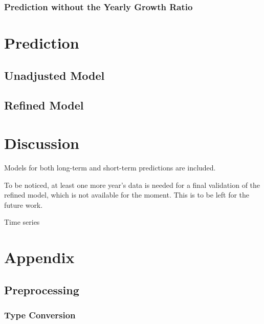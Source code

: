 \documentclass[
  twocolumn]{article}
\begin{document}
\hypertarget{prediction-without-the-yearly-growth-ratio}{%
\subsubsection{Prediction without the Yearly Growth
Ratio}\label{prediction-without-the-yearly-growth-ratio}}

\hypertarget{prediction}{%
\section{Prediction}\label{prediction}}

\hypertarget{unadjusted-model}{%
\subsection{Unadjusted Model}\label{unadjusted-model}}

\hypertarget{refined-model-1}{%
\subsection{Refined Model}\label{refined-model-1}}

\hypertarget{discussion}{%
\section{Discussion}\label{discussion}}

Models for both long-term and short-term predictions are included.

To be noticed, at least one more year's data is needed for a final
validation of the refined model, which is not available for the moment.
This is to be left for the future work.

Time series

\hypertarget{appendix}{%
\section{Appendix}\label{appendix}}

\hypertarget{preprocessing}{%
\subsection{Preprocessing}\label{preprocessing}}

\hypertarget{type-conversion-1}{%
\subsubsection{Type Conversion}\label{type-conversion-1}}
\end{document}

